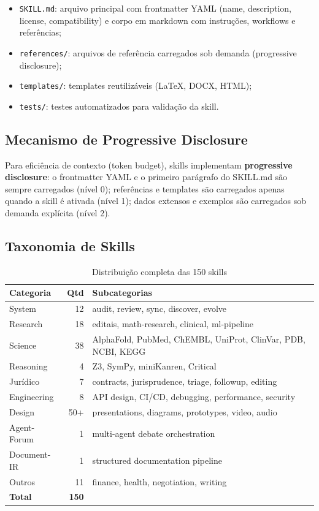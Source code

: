 \documentclass[12pt,a4paper,sumario=tradicional]{abntex2}
\begin{document}
\begin{itemize}
    \item \texttt{SKILL.md}: arquivo principal com frontmatter YAML (name, description, license, compatibility) e corpo em markdown com instruções, workflows e referências;
    \item \texttt{references/}: arquivos de referência carregados sob demanda (progressive disclosure);
    \item \texttt{templates/}: templates reutilizáveis (LaTeX, DOCX, HTML);
    \item \texttt{tests/}: testes automatizados para validação da skill.
\end{itemize}

\subsection{Mecanismo de Progressive Disclosure}

Para eficiência de contexto (token budget), skills implementam \textbf{progressive disclosure}: o frontmatter YAML e o primeiro parágrafo do SKILL.md são sempre carregados (nível 0); referências e templates são carregados apenas quando a skill é ativada (nível 1); dados extensos e exemplos são carregados sob demanda explícita (nível 2).

\subsection{Taxonomia de Skills}

\begin{table}[H]
\centering
\caption{Distribuição completa das 150 skills}
\label{tab:skills-full}
\begin{tabular}{@{}lrl@{}}
\toprule
\textbf{Categoria} & \textbf{Qtd} & \textbf{Subcategorias} \\
\midrule
System & 12 & audit, review, sync, discover, evolve \\
Research & 18 & editais, math-research, clinical, ml-pipeline \\
Science & 38 & AlphaFold, PubMed, ChEMBL, UniProt, ClinVar, PDB, NCBI, KEGG \\
Reasoning & 4 & Z3, SymPy, miniKanren, Critical \\
Jurídico & 7 & contracts, jurisprudence, triage, followup, editing \\
Engineering & 8 & API design, CI/CD, debugging, performance, security \\
Design & 50+ & presentations, diagrams, prototypes, video, audio \\
Agent-Forum & 1 & multi-agent debate orchestration \\
Document-IR & 1 & structured documentation pipeline \\
Outros & 11 & finance, health, negotiation, writing \\
\midrule
\textbf{Total} & \textbf{150} & \\
\bottomrule
\end{tabular}
\end{table}
\end{document}
